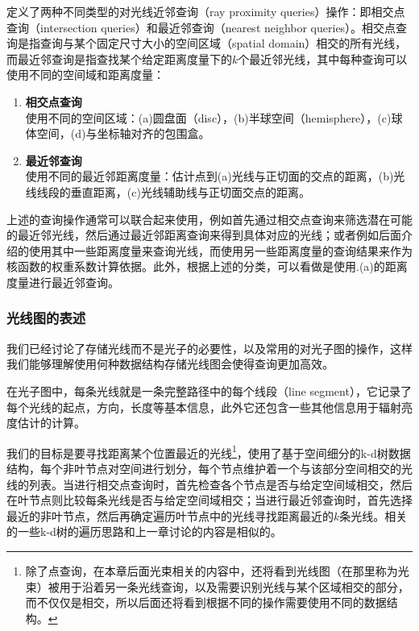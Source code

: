 \cite{a:RayMapsforGlobalIllumination}定义了两种不同类型的对光线近邻查询（ray proximity queries）操作：即相交点查询（intersection queries）和最近邻查询（nearest neighbor queries）。相交点查询是指查询与某个固定尺寸大小的空间区域（spatial domain）相交的所有光线，而最近邻查询是指查找某个给定距离度量下的$k$个最近邻光线，其中每种查询可以使用不同的空间域和距离度量：

\begin{enumerate}[label=\Roman*.]
	\item \textbf{相交点查询}\\
		使用不同的空间区域：(a)圆盘面（disc），(b)半球空间（hemisphere），(c)球体空间，(d)与坐标轴对齐的包围盒。
	\item \textbf{最近邻查询}\\
		使用不同的最近邻距离度量：估计点到(a)光线与正切面的交点的距离，(b)光线线段的垂直距离，(c)光线辅助线与正切面交点的距离。
\end{enumerate}

上述的查询操作通常可以联合起来使用，例如首先通过相交点查询来筛选潜在可能的最近邻光线，然后通过最近邻距离查询来得到具体对应的光线；或者例如后面介绍的使用其中一些距离度量来查询光线，而使用另一些距离度量的查询结果来作为核函数的权重系数计算依据。此外，根据上述的分类，\cite{a:AParticlePathbasedMethodforMonteCarloDensityEstimation}可以看做是使用.(a)的距离度量进行最近邻查询。




\subsubsection{光线图的表述}\label{sec:pm-ray-maps-data}
我们已经讨论了存储光线而不是光子的必要性，以及常用的对光子图的操作，这样我们能够理解使用何种数据结构存储光线图会使得查询更加高效。

在光子图中，每条光线就是一条完整路径中的每个线段（line segment），它记录了每个光线的起点，方向，长度等基本信息，此外它还包含一些其他信息用于辐射亮度估计的计算。

我们的目标是要寻找距离某个位置最近的光线\footnote{除了点查询，在本章后面光束相关的内容中，还将看到光线图（在那里称为光束）被用于沿着另一条光线查询，以及需要识别光线与某个区域相交的部分，而不仅仅是相交，所以后面还将看到根据不同的操作需要使用不同的数据结构。}，\cite{a:RayMapsforGlobalIllumination}使用了基于空间细分的k-d树数据结构，每个非叶节点对空间进行划分，每个节点维护着一个与该部分空间相交的光线的列表。当进行相交点查询时，首先检查各个节点是否与给定空间域相交，然后在叶节点则比较每条光线是否与给定空间域相交；当进行最近邻查询时，首先选择最近的非叶节点，然后再确定遍历叶节点中的光线寻找距离最近的$k$条光线。相关的一些k-d树的遍历思路和上一章讨论的内容是相似的。




